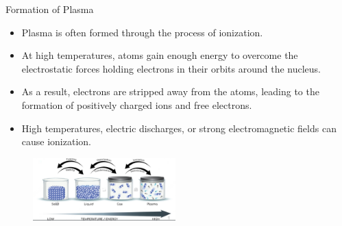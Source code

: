 \documentclass[13pt]{beamer}
\begin{document}
	\begin{frame}[t]{Formation of Plasma}
		\begin{itemize}
			\item Plasma is often formed through the process of {\color{magenta}ionization}.
		\item	At high temperatures, atoms gain enough energy to overcome the electrostatic forces holding electrons in their orbits around the nucleus.

		\item 	As a result, electrons are stripped away from the atoms, leading to the formation of positively charged ions and free electrons.
		\item {\color{red} High temperatures, electric discharges, or strong electromagnetic fields} can cause ionization.



		\end{itemize}
%
%

%
%
%

	\begin{figure}
	\centering
		\href{https://github.com/saurabhsg99/Plasma-ppt/blob/main/Images/formation.jpeg?raw=true}{
	\includegraphics[width = 5.5cm]{Images/formation.jpeg}}
\end{figure}



	\end{frame}
\end{document}
